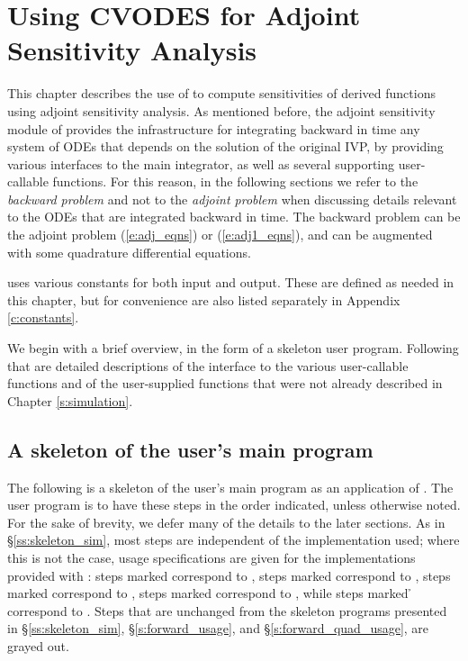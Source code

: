 \chapter{Using CVODES for Adjoint Sensitivity Analysis}\label{s:adjoint}

This chapter describes the use of {\cvodes} to compute sensitivities of derived 
functions using adjoint sensitivity analysis. As mentioned before, the adjoint
sensitivity module of {\cvodes} provides the infrastructure for integrating
backward in time any system of ODEs that depends on the solution of the original
IVP, by providing various interfaces to the main {\cvodes} integrator, as well 
as several supporting user-callable functions. For this reason, in the following
sections we refer to the {\em backward problem} and not to the 
{\em adjoint problem} when discussing details relevant to the ODEs that
are integrated backward in  time. The backward problem can be the adjoint problem
(\ref{e:adj_eqns}) or (\ref{e:adj1_eqns}), and
can be augmented with some quadrature differential equations.

{\cvodes} uses various constants for both input and output.  These are
defined as needed in this chapter, but for convenience are also listed
separately in Appendix \ref{c:constants}.

We begin with a brief overview, in the form of a skeleton user program.
Following that are detailed descriptions of the interface to the
various user-callable functions and of the user-supplied functions that were not
already described in Chapter \ref{s:simulation}.

\section{A skeleton of the user's main program}
\label{ss:skeleton_adj}

The following is a skeleton of the user's main program as an application of
{\cvodes}. The user program is to have these steps in the order indicated, 
unless otherwise noted. For the sake of brevity, we defer many of the details to 
the later sections.
As in \S\ref{ss:skeleton_sim}, most steps are independent of the {\nvector}
implementation used; where this is not the case, usage specifications are given
for the implementations provided with {\cvodes}:
steps marked {\s} correspond to {\nvecs},
steps marked {\omp} correspond to {\nvecopenmp},
steps marked {\pt} correspond to {\nvecpthreads},
steps marked {\p} correspond to {\nvecp}, while
steps marked {\h} correspond to {\nvecph}.
Steps that are unchanged from the skeleton programs presented in
\S\ref{ss:skeleton_sim}, \S\ref{s:forward_usage}, and \S\ref{s:forward_quad_usage},
are grayed out.


